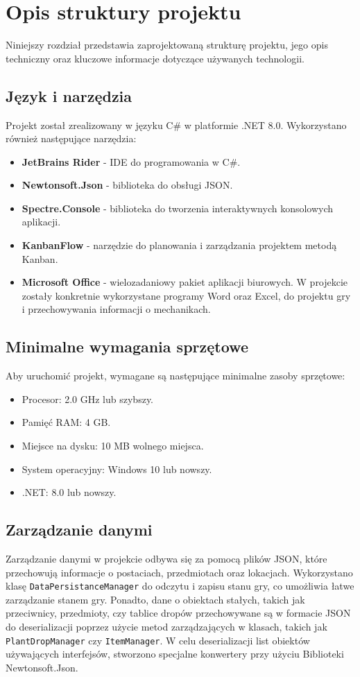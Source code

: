 ﻿%
\chapter{Opis struktury projektu}

Niniejszy rozdział przedstawia zaprojektowaną strukturę projektu, 
jego opis techniczny oraz kluczowe informacje dotyczące używanych technologii. 

\section{Język i narzędzia}
Projekt został zrealizowany w języku C\# w platformie .NET 8.0. Wykorzystano również następujące narzędzia:
\begin{itemize}
    \item \textbf{JetBrains Rider} - IDE do programowania w C\#.
    \item \textbf{Newtonsoft.Json} - biblioteka do obsługi JSON.
    \item \textbf{Spectre.Console} - biblioteka do tworzenia interaktywnych konsolowych aplikacji.
    \item \textbf{KanbanFlow} - narzędzie do planowania i zarządzania projektem metodą Kanban.
    \item \textbf{Microsoft Office} - wielozadaniowy pakiet aplikacji biurowych. 
    W projekcie zostały konkretnie wykorzystane programy Word oraz Excel, do projektu gry i 
    przechowywania informacji o mechanikach.
\end{itemize}

\section{Minimalne wymagania sprzętowe}
Aby uruchomić projekt, wymagane są następujące minimalne zasoby sprzętowe:
\begin{itemize}
    \item Procesor: 2.0 GHz lub szybszy.
    \item Pamięć RAM: 4 GB.
    \item Miejsce na dysku: 10 MB wolnego miejsca.
    \item System operacyjny: Windows 10 lub nowszy.
    \item .NET: 8.0 lub nowszy.
\end{itemize}

\section{Zarządzanie danymi}
Zarządzanie danymi w projekcie odbywa się za pomocą plików JSON, które przechowują informacje o postaciach, 
przedmiotach oraz lokacjach. Wykorzystano klasę \texttt{DataPersistanceManager} do odczytu i zapisu stanu gry, 
co umożliwia łatwe zarządzanie stanem gry. Ponadto, dane o obiektach stałych, takich jak przeciwnicy, przedmioty, 
czy tablice dropów przechowywane są w formacie JSON do deserializacji poprzez użycie metod zarządzających w klasach, 
takich jak \texttt{PlantDropManager} czy \texttt{ItemManager}. W celu deserializacji list obiektów używających interfejsów, stworzono
specjalne konwertery przy użyciu Biblioteki Newtonsoft.Json.



